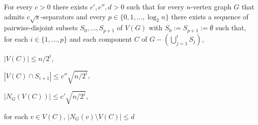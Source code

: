 \documentclass{patmorin}
\renewcommand{\le}{\leqslant}
\begin{document}
\begin{lem}\label{recursive_separator}
  For every $c>0$ there exists $c',c'',d>0$ such that for every $n$-vertex graph $G$ that admits $c\sqrt{s}$-separators and every $p\in\{0,1,\ldots,\log_2 n\}$ there exists a sequence of pairwise-disjoint subsets $S_0,\ldots,S_{p+1}$ of $V(G)$ with $S_0:=S_{p+1}:=\emptyset$ such that, for each $i\in\{1,\ldots,p\}$ and each component $C$ of $G-(\bigcup_{j=1}^i S_j)$,
  \begin{compactenum}[(a)]
    \item $|V(C)|\le n/2^i$,
    \item $|V(C)\cap S_{i+1}|\le c''\sqrt{n/2^i}$,
    \item $|N_G(V(C))|\le c'\sqrt{n/2^i}$,
    \item for each $v\in V(C)$, $|N_G(v)\setminus V(C)|\le d$
  \end{compactenum}
\end{lem}
\end{document}
